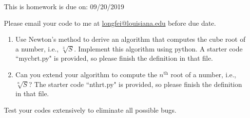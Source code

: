 \documentclass[11pt]{article}
\begin{document}
This is homework is due on: {\color{red}09/20/2019} 


Please email your code to me at \href{mailto:longfei@louisiana.edu}{longfei@louisiana.edu} before due date. \\



 
\begin{enumerate}
\item  Use Newton's method to derive an algorithm that computes the cube root of a number, i.e., $\sqrt[3]{S}$. Implement this algorithm using python.  A starter code ``mycbrt.py" is provided, so please finish the definition in that file.

\item Can you extend your algorithm to compute the $n^\text{th}$ root of a number, i.e., $\sqrt[n]{S}$?  
 The starter code ``nthrt.py" is provided, so please finish the definition in that file.
\end{enumerate}

Test your codes extensively to eliminate all possible bugs.
\end{document}
